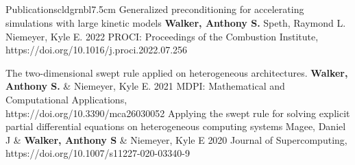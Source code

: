 \documentclass[lighthipster]{simplehipstercv}
\begin{document}
\begin{paracol}{2}
\section{\faFile}{Publications}{cldgrnbl}{7.5cm}
\publication
{Generalized preconditioning for accelerating simulations with large kinetic models}
{\textbf{Walker, Anthony S.} Speth, Raymond L. Niemeyer, Kyle E.}
{2022}
{PROCI: Proceedings of the Combustion Institute,\\https://doi.org/10.1016/j.proci.2022.07.256}
{}

\publication
{The two-dimensional swept rule applied on heterogeneous architectures.} %
{\textbf{Walker, Anthony S.} \& Niemeyer,  Kyle E.} %
{2021} %
{MDPI: Mathematical and Computational Applications,\\ https://doi.org/10.3390/mca26030052} %
{} %
\publication
{Applying the swept rule for solving explicit partial differential equations on heterogeneous computing systems} %
{Magee, Daniel J \& \textbf{Walker, Anthony S} \& Niemeyer, Kyle E} %
{2020} %
{Journal of Supercomputing,\\ https://doi.org/10.1007/s11227-020-03340-9} %
{} %





 


\end{paracol}
\end{document}
